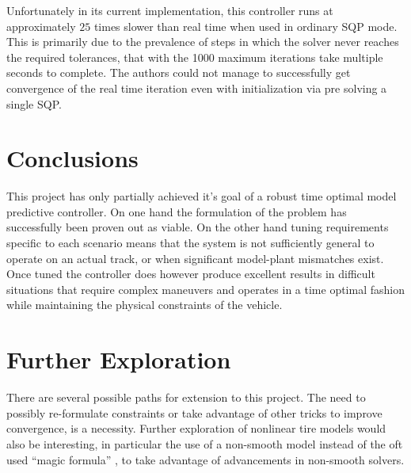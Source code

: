 \documentclass[conference,11pt]{IEEEtran}
\begin{document}
Unfortunately in its current implementation, this controller runs at approximately $25$ times slower than real time when used in ordinary SQP mode. This is primarily due to the prevalence of
steps in which the solver never reaches the required tolerances, that with the 1000 maximum iterations take multiple seconds to complete. The authors could not manage to successfully get convergence
of the real time iteration even with initialization via pre solving a single SQP.

\section{Conclusions}
This project has only partially achieved it's goal of a robust time optimal model predictive controller. On one hand the formulation of the problem has successfully been proven out as viable.
On the other hand tuning requirements specific to each scenario means that the system is not sufficiently general to operate on an actual track, or when significant model-plant mismatches exist.
Once tuned the controller does however produce excellent results in difficult situations that require complex maneuvers and operates in a time optimal fashion while maintaining the physical
constraints of the vehicle. 



\section{Further Exploration}

There are several possible paths for extension to this project. The need to possibly re-formulate constraints or take advantage of other tricks to improve convergence, is a necessity.
Further exploration of nonlinear tire models would also be interesting, in particular the use of a non-smooth model instead of the oft used ``magic formula'' \cite{PAUWELUSSEN2015239}, to take
advantage of advancements in non-smooth solvers.



\end{document}
